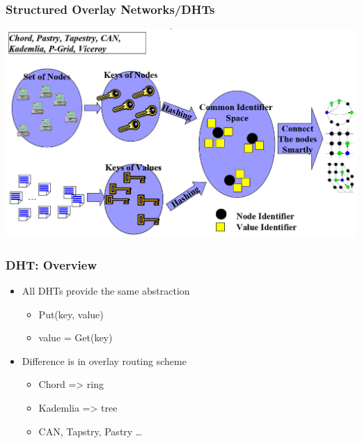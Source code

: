 \begin{frame}
    \frametitle{Structured Overlay Networks/DHTs}
    \includegraphics[scale=0.27]{figures/dht.png}
\end{frame}

\begin{frame}
    \frametitle{DHT: Overview}
    \begin{itemize}
        \item All DHTs provide the same abstraction
        \begin{itemize}
            \item Put(key, value)
            \item value = Get(key)
        \end{itemize}
        \item Difference is in overlay routing scheme
        \begin{itemize}
            \item Chord => ring
            \item Kademlia => tree
            \item CAN, Tapstry, Pastry \ldots
        \end{itemize}
    \end{itemize}
\end{frame}

